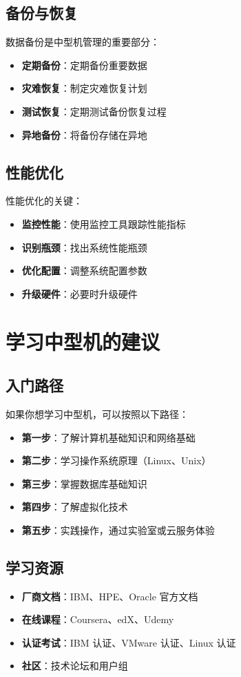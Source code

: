 \documentclass[12pt,UTF8]{ctexbook}
\begin{document}
\section{备份与恢复}

数据备份是中型机管理的重要部分：

\begin{itemize}[leftmargin=2cm]
    \item \textbf{定期备份}：定期备份重要数据
    \item \textbf{灾难恢复}：制定灾难恢复计划
    \item \textbf{测试恢复}：定期测试备份恢复过程
    \item \textbf{异地备份}：将备份存储在异地
\end{itemize}

\section{性能优化}

性能优化的关键：

\begin{itemize}[leftmargin=2cm]
    \item \textbf{监控性能}：使用监控工具跟踪性能指标
    \item \textbf{识别瓶颈}：找出系统性能瓶颈
    \item \textbf{优化配置}：调整系统配置参数
    \item \textbf{升级硬件}：必要时升级硬件
\end{itemize}

\chapter{学习中型机的建议}
\label{chap:learning}

\section{入门路径}

如果你想学习中型机，可以按照以下路径：

\begin{itemize}[leftmargin=2cm]
    \item \textbf{第一步}：了解计算机基础知识和网络基础
    \item \textbf{第二步}：学习操作系统原理（Linux、Unix）
    \item \textbf{第三步}：掌握数据库基础知识
    \item \textbf{第四步}：了解虚拟化技术
    \item \textbf{第五步}：实践操作，通过实验室或云服务体验
\end{itemize}

\section{学习资源}

\begin{itemize}[leftmargin=2cm]
    \item \textbf{厂商文档}：IBM、HPE、Oracle 官方文档
    \item \textbf{在线课程}：Coursera、edX、Udemy
    \item \textbf{认证考试}：IBM 认证、VMware 认证、Linux 认证
    \item \textbf{社区}：技术论坛和用户组
\end{itemize}

\backmatter
\end{document}
